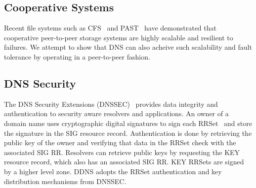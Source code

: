 \subsection{Cooperative Systems}

Recent file systems such as CFS~\cite{cfs:sosp01} and 
PAST~\cite{past:sosp} have demonstrated that cooperative 
peer-to-peer storage systems 
are highly scalable and resilient to failures. We attempt
to show that DNS can also acheive such scalability 
and fault tolerance by operating in a peer-to-peer fashion.


\subsection{DNS Security}

The DNS Security Extensions (DNSSEC)~\cite{dnssec:rfc} 
provides data integrity and authentication to security aware 
resolvers and applications. An owner of a domain name uses
cryptographic digital signatures to sign each RRSet~\cite{dns-cla:rfc}
and store the signature in the SIG resource record. 
Authentication is done by retrieving the public key of the
owner and verifying that data in the RRSet check with the 
associated SIG RR. Resolvers can retrieve public keys by 
requesting the KEY resource record, which also has an associated
SIG RR. KEY RRSets are signed by a higher level zone. DDNS adopts 
the RRSet authentication and key distribution mechanisms from DNSSEC.

